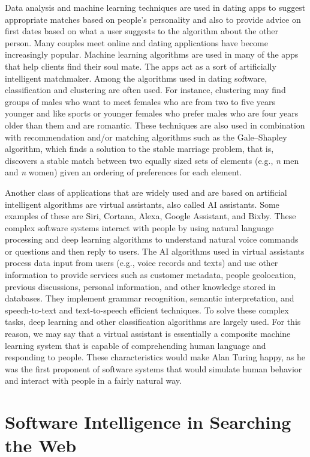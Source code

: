 Data analysis and machine learning techniques are used in dating apps to suggest appropriate matches based on people's personality and also to provide advice on first dates based on what a user suggests to the algorithm about the other person. Many couples meet online and dating applications have become increasingly popular. Machine learning algorithms are used in many of the apps that help clients find their soul mate. The apps act as a sort of artificially intelligent matchmaker. Among the algorithms used in dating software, classification and clustering are often used. For instance, clustering may find groups of males who want to meet females who are from two to five years younger and like sports or younger females who prefer males who are four years older than them and are romantic. These techniques are also used in combination with recommendation and/or matching algorithms such as the Gale--Shapley algorithm, which finds a solution to the stable marriage problem, that is, discovers a stable match between two equally sized sets of elements (e.g., \textit{n} men and \textit{n} women) given an ordering of preferences for each element.

Another class of applications that are widely used and are based on artificial intelligent algorithms are virtual assistants, also called AI assistants. Some examples of these are Siri, Cortana, Alexa, Google Assistant, and Bixby. These \hbox{complex} software systems interact with people by using natural language processing and deep learning algorithms to understand natural voice commands or questions and then reply to users. The AI algorithms used in virtual assistants process data input from users (e.g., voice records and texts) and use other information to provide services such as customer metadata, people geolocation, previous discussions, personal information, and other knowledge stored in databases. They implement grammar recognition, semantic interpretation, and speech-to-text and text-to-speech efficient techniques. To solve these complex tasks, deep learning and other classification algorithms are largely used. For this reason, we may say that a virtual assistant is essentially a composite machine learning system that is capable of comprehending human language and responding to people. These characteristics would make Alan Turing happy, as he was the first proponent of software systems that would simulate human behavior and interact with people in a fairly natural way.

\section{\label{sec:5.2}Software Intelligence in Searching the Web}

